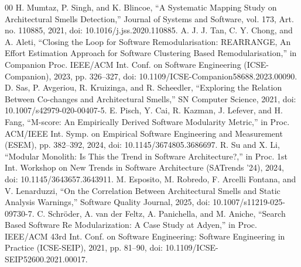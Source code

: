 \documentclass[conference]{IEEEtran}
\begin{document}
\begin{thebibliography}{00}
 H. Mumtaz, P. Singh, and K. Blincoe, “A Systematic Mapping Study on Architectural Smells Detection,” Journal of Systems and Software, vol. 173, Art. no. 110885, 2021, doi: 10.1016/j.jss.2020.110885.
 A. J. J. Tan, C. Y. Chong, and A. Aleti, “Closing the Loop for Software Remodularisation: REARRANGE, An Effort Estimation Approach for Software Clustering Based Remodularisation,” in Companion Proc. IEEE/ACM Int. Conf. on Software Engineering (ICSE-Companion), 2023, pp. 326–327, doi: 10.1109/ICSE-Companion58688.2023.00090.
 D. Sas, P. Avgeriou, R. Kruizinga, and R. Scheedler, “Exploring the Relation Between Co-changes and Architectural Smells,” SN Computer Science, 2021, doi: 10.1007/s42979-020-00407-5.
 E. Pisch, Y. Cai, R. Kazman, J. Lefever, and H. Fang, “M-score: An Empirically Derived Software Modularity Metric,” in Proc. ACM/IEEE Int. Symp. on Empirical Software Engineering and Measurement (ESEM), pp. 382–392, 2024, doi: 10.1145/3674805.3686697.
 R. Su and X. Li, “Modular Monolith: Is This the Trend in Software Architecture?,” in Proc. 1st Int. Workshop on New Trends in Software Architecture (SATrends ’24), 2024, doi: 10.1145/3643657.3643911.
 M. Esposito, M. Robredo, F. Arcelli Fontana, and V. Lenarduzzi, “On the Correlation Between Architectural Smells and Static Analysis Warnings,” Software Quality Journal, 2025, doi: 10.1007/s11219-025-09730-7.
 C. Schr\"oder, A. van der Feltz, A. Panichella, and M. Aniche, “Search Based Software Re Modularization: A Case Study at Adyen,” in Proc. IEEE/ACM 43rd Int. Conf. on Software Engineering: Software Engineering in Practice (ICSE-SEIP), 2021, pp. 81–90, doi: 10.1109/ICSE-SEIP52600.2021.00017.
\end{thebibliography}
\end{document}
